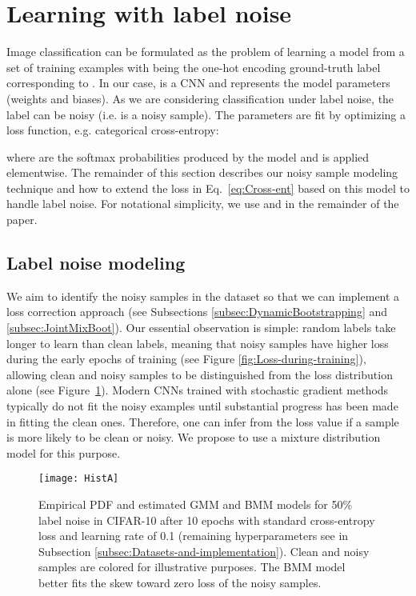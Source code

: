 \documentclass{article}
\begin{document}
\section{Learning with label noise}

Image classification can be formulated as the problem of learning a model  from a set of training examples  with  being the one-hot encoding ground-truth label corresponding to .
In our case,  is a CNN and  represents the model parameters (weights and biases).
As we are considering classification under label noise, the label  can be noisy (i.e.  is a noisy sample).
The parameters  are fit by optimizing a loss function, e.g. categorical cross-entropy:

where  are the softmax probabilities produced by the model and  is applied elementwise. 
The remainder of this section describes our noisy sample modeling technique and how to extend the loss in Eq.~\eqref{eq:Cross-ent} based on this model to handle label noise. 
For notational simplicity, we use  and  in the remainder of the paper.

\subsection{Label noise modeling\label{subsec:Label-noise-modeling}}

We aim to identify the noisy samples in the dataset 
so that we can implement a loss correction approach (see Subsections
\ref{subsec:DynamicBootstrapping} and \ref{subsec:JointMixBoot}).
Our essential observation is simple: random labels take longer to learn than
clean labels, meaning that noisy samples have higher loss during the early epochs
of training (see Figure \ref{fig:Loss-during-training}), allowing clean and noisy samples to be distinguished from the loss distribution alone (see Figure~\ref{fig:Normalized-histograms}). Modern CNNs trained 
with stochastic gradient methods typically do not fit the noisy examples until 
substantial progress has been made in fitting the clean ones. Therefore, one
can infer from the loss value if a sample is more likely to be clean or
noisy. We propose to use a mixture distribution model for this purpose. 



\begin{figure}[t]
\centering{}\texttt{[image: HistA]}\caption{\label{fig:Normalized-histograms}Empirical PDF and estimated GMM and BMM models for 50\% label noise in CIFAR-10 after 10 epochs with standard cross-entropy loss and learning rate of 0.1 (remaining hyperparameters see in Subsection \ref{subsec:Datasets-and-implementation}). Clean and noisy samples are colored for illustrative purposes. The BMM model better fits the skew toward zero loss of the noisy samples.}
\end{figure}
\end{document}
